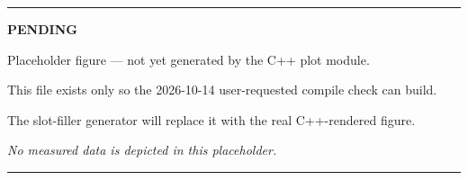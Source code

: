 \documentclass[12pt]{article}
\begin{document}
\begin{center}
\rule{\textwidth}{0.4pt}
\vspace{2em}

{\Large\bfseries PENDING}
\vspace{1em}

Placeholder figure --- not yet generated by the C++ plot module.

This file exists only so the 2026-10-14 user-requested compile check can build.

The slot-filler generator will replace it with the real C++-rendered figure.
\vspace{2em}

{\itshape No measured data is depicted in this placeholder.}
\vspace{2em}

\rule{\textwidth}{0.4pt}
\end{center}
\end{document}
